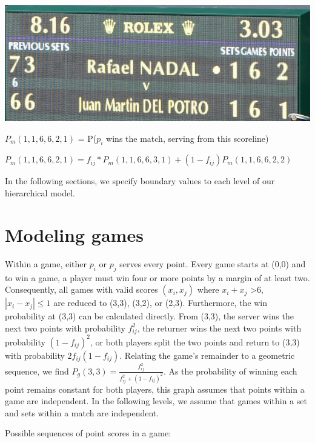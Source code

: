 \documentclass[chapterprefix=false]{report}
\begin{document}
\begin{center}

\includegraphics[scale=.3]{scoreboard}

$P_m(1,1,6,6,2,1)$ = P($p_i$ wins the match, serving from this scoreline)

$P_m(1,1,6,6,2,1) = f_{ij}*P_m(1,1,6,6,3,1) + (1-f_{ij}) P_m(1,1,6,6,2,2)$


\end{center}
In the following sections, we specify boundary values to each level of our hierarchical model. 



\section{Modeling games}

Within a game, either $p_i$ or $p_j$ serves every point. Every game starts at (0,0) and to win a game, a player must win four or more points by a margin of at least two. Consequently, all games with valid scores $(x_i,x_j)$ where $x_i+x_j$ \textgreater $6,$ $|x_i-x_j| \leq 1$ are reduced to (3,3), (3,2), or (2,3). Furthermore, the win probability at (3,3) can be calculated directly. From (3,3), the server wins the next two points with probability $f_{ij}^2$, the returner wins the next two points with probability $(1-f_{ij})^2$, or both players split the two points and return to (3,3) with probability $2f_{ij}(1-f_{ij})$. Relating the game's remainder to a geometric sequence, we find $P_g(3,3) = \frac{f_{ij}^2}{f_{ij}^2+(1-f_{ij})^2}$. As the probability of winning each point remains constant for both players, this graph assumes that points within a game are independent. In the following levels, we assume that games within a set and sets within a match are independent.

Possible sequences of point scores in a game:
\end{document}
